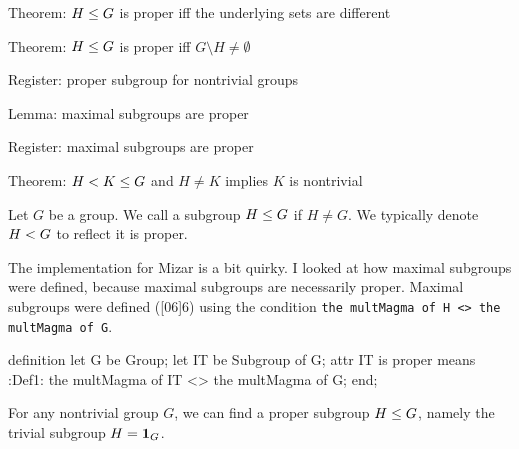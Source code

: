 \LA{}Theorem: $H\leq G$ is proper iff the underlying sets are different~{\nwtagstyle{}}\RA{}

\LA{}Theorem: $H\leq G$ is proper iff $G\setminus H\neq\emptyset$~{\nwtagstyle{}}\RA{}

\LA{}Register: proper subgroup for nontrivial groups~{\nwtagstyle{}}\RA{}

\LA{}Lemma: maximal subgroups are proper~{\nwtagstyle{}}\RA{}

\LA{}Register: maximal subgroups are proper~{\nwtagstyle{}}\RA{}

\LA{}Theorem: $H< K\leq G$ and $H\neq K$ implies $K$ is nontrivial~{\nwtagstyle{}}\RA{}
\nwendcode{}\nwdocspar

\begin{definition}
Let $G$ be a group. We call a subgroup $H\leq G$  if
$H\neq G$. We typically denote $H< G$ to reflect it is proper.
\end{definition}

\begin{def-remark}
The implementation for Mizar is a bit quirky. I looked at how maximal
subgroups were defined, because maximal subgroups are necessarily
proper. Maximal subgroups were defined ([06]{6})
using the condition \lstinline|the multMagma of H <> the multMagma of G|.
\end{def-remark}

\nwenddocs{}\endmoddef\nwstartdeflinemarkup{}\nwenddeflinemarkup
definition
  let G be Group;
  let IT be Subgroup of G;
  attr IT is proper means
  :Def1:
  the multMagma of IT <> the multMagma of G;
end;
\eatline
{}\nwendcode{}\nwdocspar
\begin{registration}
For any nontrivial group $G$, we can find a proper subgroup $H\leq G$,
namely the trivial subgroup $H=\mathbf{1}_{G}$.
\end{registration}

